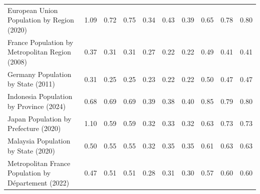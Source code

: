 \begin{tabular}{lccc|ccc|ccc}
               European Union Population by Region (2020) &                      1.09 &                      0.72 &                         0.75 &                        0.34 &                        0.43 &                           0.39 &                          0.65 &                          0.78 &                             0.80 \\
          France Population by Metropolitan Region (2008) &                      0.37 &                      0.31 &                         0.31 &                        0.27 &                        0.22 &                           0.22 &                          0.49 &                          0.41 &                             0.41 \\
                       Germany Population by State (2011) &                      0.31 &                      0.25 &                         0.25 &                        0.23 &                        0.22 &                           0.22 &                          0.50 &                          0.47 &                             0.47 \\
                  Indonesia Population by Province (2024) &                      0.68 &                      0.69 &                         0.69 &                        0.39 &                        0.38 &                           0.40 &                          0.85 &                          0.79 &                             0.80 \\
                    Japan Population by Prefecture (2020) &                      1.10 &                      0.59 &                         0.59 &                        0.32 &                        0.33 &                           0.32 &                          0.63 &                          0.73 &                             0.73 \\
                      Malaysia Population by State (2020) &                      0.50 &                      0.55 &                         0.55 &                        0.32 &                        0.35 &                           0.35 &                          0.61 &                          0.63 &                             0.63 \\
     Metropolitan France Population by Département (2022) &                      0.47 &                      0.51 &                         0.51 &                        0.28 &                        0.31 &                           0.30 &                          0.57 &                          0.60 &                             0.60 \\

\end{tabular}
